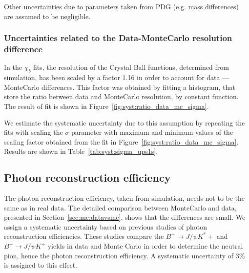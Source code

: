 Other uncertainties due to parameters taken from PDG (e.g. mass differences)
are assumed to be negligible.

\subsubsection{Uncertainties related to the Data-MonteCarlo resolution difference}

In the $\chi_b$ fits, the resolution of the Crystal Ball functions, determined
from simulation, has been scaled by a factor 1.16 in order to account for data ---
MonteCarlo differences. This factor was obtained by fitting a histogram, 
that store the ratio between data and MonteCarlo resolution, by constant function.
The result of fit is shown in Figure~\ref{fig:syst:ratio_data_mc_sigma}.




We estimate the systematic uncertainty due to this assumption by repeating the
fits with scaling the $\sigma$ parameter with maximum and minimum values of
the scaling factor obtained from the fit in Figure~\ref{fig:syst:ratio_data_mc_sigma}.
Results are shown in Table~\ref{tab:syst:sigma_ups1s}.



\subsection{Photon reconstruction efficiency}
The photon reconstruction efficiency, taken from simulation, needs not to be
the same as in real data. The detailed comparison between MonteCarlo and data,
presented in Section~\ref{sec:mc:datavsmc}, shows that the differences
are small. We assign a systematic uncertainty based on previous studies of
photon reconstruction efficiencies. These studies compare the $B^+ \rightarrow
J/\psi K^*+$ and $B^+ \rightarrow J/\psi K^+$ yields in data and Monte Carlo in
order to determine the neutral pion, hence the photon  reconstruction
efficiency. A systematic uncertainty of 3\% is assigned to this effect.








% 
% 
% 
% 
% 
% 



